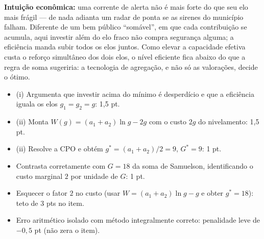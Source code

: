 \begin{solucao}
\textbf{Intuição econômica:} uma corrente de alerta não é mais forte do que seu elo mais frágil --- de nada adianta um radar de ponta se as sirenes do município falham. Diferente de um bem público ``somável'', em que cada contribuição se acumula, aqui investir além do elo fraco não compra segurança alguma; a eficiência manda subir todos os elos juntos. Como elevar a capacidade efetiva custa o reforço simultâneo dos dois elos, o nível eficiente fica abaixo do que a regra de soma sugeriria: a tecnologia de agregação, e não só as valorações, decide o ótimo.
\rubricalabel
\begin{itemize}
\item (i) Argumenta que investir acima do mínimo é desperdício e que a eficiência iguala os elos $g_1=g_2=g$: 1{,}5 pt.
\item (ii) Monta $W(g)=(a_1+a_2)\ln g-2g$ com o custo $2g$ do nivelamento: 1{,}5 pt.
\item (ii) Resolve a CPO e obtém $g^{*}=(a_1+a_2)/2=9$, $G^{*}=9$: 1 pt.
\item Contrasta corretamente com $G=18$ da soma de Samuelson, identificando o custo marginal $2$ por unidade de $G$: 1 pt.
\item Esquecer o fator $2$ no custo (usar $W=(a_1+a_2)\ln g-g$ e obter $g^{*}=18$): teto de 3 pts no item.
\item Erro aritmético isolado com método integralmente correto: penalidade leve de $-0{,}5$ pt (não zera o item).
\end{itemize}
\end{solucao}

